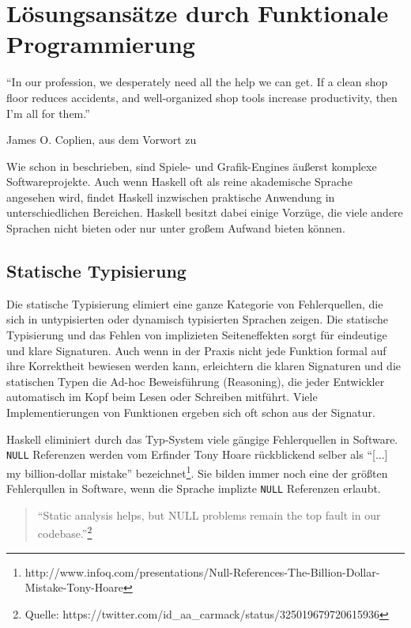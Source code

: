 \chapter{Lösungsansätze durch Funktionale Programmierung}\label{chap:loesungen-durch-fp}

\epigraph{"`In our profession, we desperately need all the help we can get. If a clean shop floor reduces accidents, and well-organized shop tools increase productivity, then I’m all for them."'}{James O. Coplien, aus dem Vorwort zu }

Wie schon in  beschrieben, sind Spiele- und Grafik-Engines äußerst komplexe Softwareprojekte. Auch wenn Haskell oft als reine akademische Sprache angesehen wird, findet Haskell inzwischen praktische Anwendung in unterschiedlichen Bereichen. Haskell besitzt dabei einige Vorzüge, die viele andere Sprachen nicht bieten oder nur unter großem Aufwand bieten können.

\section{Statische Typisierung}\label{sec:statische-typisierung}

Die statische Typisierung elimiert eine ganze Kategorie von Fehlerquellen, die sich  in untypisierten oder dynamisch typisierten Sprachen zeigen. Die statische Typisierung und das Fehlen von implizieten Seiteneffekten sorgt für eindeutige und klare Signaturen. Auch wenn in der Praxis nicht jede Funktion formal auf ihre Korrektheit bewiesen werden kann, erleichtern die klaren Signaturen und die statischen Typen die Ad-hoc Beweisführung (Reasoning), die jeder Entwickler automatisch im Kopf beim Lesen oder Schreiben mitführt. Viele Implementierungen von Funktionen ergeben sich oft schon aus der Signatur.

Haskell eliminiert durch das Typ-System viele gängige Fehlerquellen in Software. \texttt{NULL} Referenzen werden vom Erfinder Tony Hoare rückblickend selber als "`[...] my billion-dollar mistake"' bezeichnet\footnote{http://www.infoq.com/presentations/Null-References-The-Billion-Dollar-Mistake-Tony-Hoare}. Sie bilden immer noch eine der größten Fehlerqullen in Software, wenn die Sprache implizte \texttt{NULL} Referenzen erlaubt. 

\begin{quote}
"`Static analysis helps, but NULL problems remain the top fault in our codebase."'\footnote{\label{note:carmack-null}Quelle: https://twitter.com/id\_aa\_carmack/status/325019679720615936}
\end{quote}


